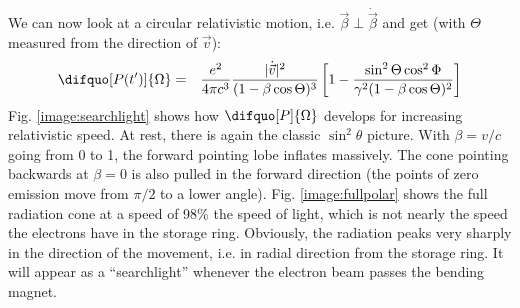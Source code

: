\documentclass[a4paper,10pt]{article}
\begin{document}
    We can now look at a circular relativistic motion, i.e. $\vec{\beta} \perp
\dot{\vec{\beta}}$ and get (with $\Theta$ measured from the direction of
$\vec{v}$):
\begin{eqnarray}
  \difquo[P(t')]{\Omega}
  &=& \frac{e^2}{4 \pi c^3}
      \frac{|\dot{\vec{v}}|^2}{(1-\beta \cos \Theta)^3}
      \left[
        1 - \frac{
          \sin^2 \Theta \cos^2 \Phi
        }{
          \gamma^2 (1-\beta \cos \Theta)^2
        }
      \right] \label{eq:angular_power_relativistic_circular}
\end{eqnarray}
Fig. \ref{image:searchlight} shows how $\difquo[P]{\Omega}$ develops for
increasing relativistic speed. At rest, there is again the classic $\sin^2 \theta$
picture. With $\beta = v/c$ going from 0 to 1, the forward pointing lobe
inflates massively. The cone pointing backwards at $\beta = 0$ is also pulled
in the forward direction (the points of zero emission move from $\pi/2$ to a
lower angle). Fig. \ref{image:fullpolar} shows the full radiation cone at a
speed of 98\% the speed of light, which is not nearly the speed the electrons
have in the storage ring. Obviously, the radiation peaks very sharply in the
direction of the movement, i.e. in radial direction from the storage ring. It
will appear as a ``searchlight'' whenever the electron beam passes the bending
magnet.
\end{document}
